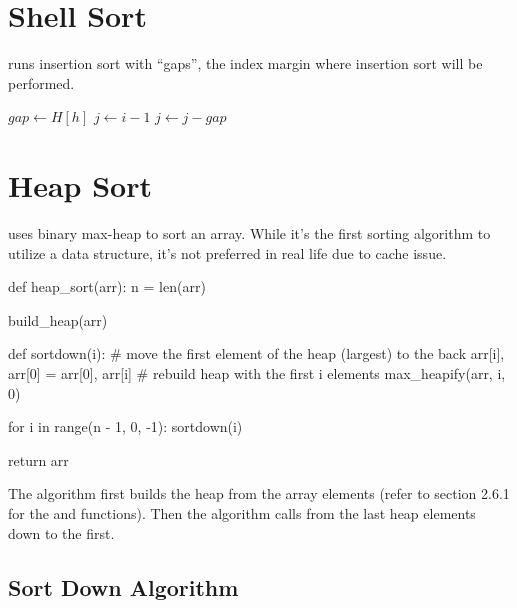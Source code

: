 \section{Shell Sort}

 runs insertion sort with ``gaps'', the index margin where insertion sort will be performed.

\noindent \hrulefill
\begin{algorithmic}[1]
   
      \State $gap \gets H[h]$
        \State $j \gets i - 1$
            \State {}
            \State $j \gets j - gap$
          \EndIf
        \EndWhile
      \EndFor
    \EndFor
    \item[]
    \State {}
  \EndFunction
\end{algorithmic}
\noindent \hrulefill

\section{Heap Sort}

 uses binary max-heap to sort an array. While it's the first sorting algorithm to utilize a data structure, it's not preferred in real life due to cache issue.

\begin{python}
def heap_sort(arr):
    n = len(arr)

    build_heap(arr)

    def sortdown(i):
        # move the first element of the heap (largest) to the back
        arr[i], arr[0] = arr[0], arr[i]
        # rebuild heap with the first i elements
        max_heapify(arr, i, 0)

    for i in range(n - 1, 0, -1):
        sortdown(i)

    return arr
\end{python}

The algorithm first builds the heap from the array elements (refer to section 2.6.1 for the  and  functions). Then the algorithm calls  from the last heap elements down to the first.

\subsection{Sort Down Algorithm}

